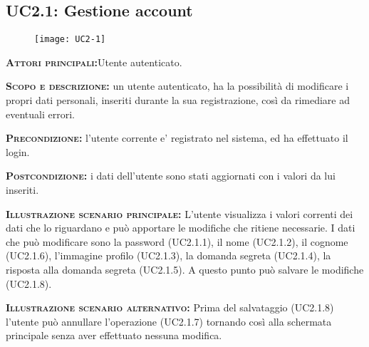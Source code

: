 \subsection{UC2.1: Gestione account}
\begin{figure}[H]
\begin{center}
\texttt{[image: UC2-1]}
\caption{}\label{fig:}
\end{center}
\end{figure}
\begin{description}
\item{\scshape\bfseries Attori principali:}Utente autenticato.
\item{\scshape\bfseries Scopo e descrizione:} un utente autenticato, ha la possibilità di modificare i propri dati personali, inseriti durante la sua registrazione, così da rimediare ad eventuali errori.
\item{\scshape\bfseries Precondizione:} l'utente corrente e' registrato nel sistema, ed ha effettuato il login.
\item{\scshape\bfseries Postcondizione:} i dati dell'utente sono stati aggiornati con i valori da lui inseriti.
\item{\scshape\bfseries Illustrazione scenario principale:} L'utente visualizza i valori correnti dei dati che lo riguardano e può apportare
le modifiche che ritiene necessarie. I dati che può modificare sono la password (UC2.1.1), il nome (UC2.1.2), il cognome (UC2.1.6), l'immagine profilo (UC2.1.3), la domanda segreta (UC2.1.4), la risposta alla domanda segreta (UC2.1.5). A questo punto può salvare le modifiche (UC2.1.8).
\item{\scshape\bfseries Illustrazione scenario alternativo:} Prima del salvataggio (UC2.1.8) l'utente può annullare l'operazione (UC2.1.7) tornando così alla schermata principale senza aver effettuato nessuna modifica.
\end{description}

